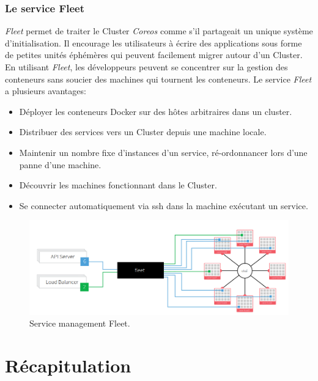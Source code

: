\begin{onehalfspace}
\subsubsection*{Le service Fleet}
\emph{Fleet} permet de traiter le Cluster \emph{Coreos} comme s'il partageait un unique système d'initialisation. Il encourage les utilisateurs à écrire des applications sous forme de petites unités éphémères qui peuvent facilement migrer autour d'un Cluster. En utilisant \emph{Fleet}, les développeurs peuvent se concentrer sur la gestion des conteneurs sans soucier des machines qui tournent les conteneurs. Le service \emph{Fleet} a plusieurs avantages: 
\begin{itemize}
\item Déployer les conteneurs Docker sur des hôtes arbitraires dans un cluster.
\item Distribuer des services vers un Cluster depuis une machine locale.
\item Maintenir un nombre fixe d'instances d'un service, ré-ordonnancer lors d'une panne d'une machine.
\item Découvrir les machines fonctionnant dans le Cluster.
\item Se connecter automatiquement via \acrshort{ssh} dans la machine exécutant un service.
\end{itemize}
\begin{figure}[H]
\centering
\includegraphics [scale=0.5]{chapitre3/assets/fleet.png}
\caption{Service management Fleet.}
\end{figure}
\end{onehalfspace}


\section{Récapitulation}


\def\arraystretch{1.6}%

